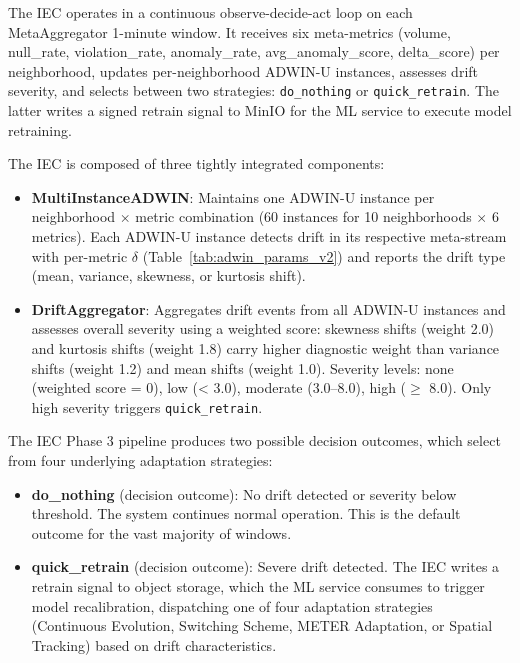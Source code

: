 The IEC operates in a continuous observe-decide-act loop on each MetaAggregator 1-minute window. It receives six meta-metrics (volume, null\_rate, violation\_rate, anomaly\_rate, avg\_anomaly\_score, delta\_score) per neighborhood, updates per-neighborhood ADWIN-U instances, assesses drift severity, and selects between two strategies: \texttt{do\_nothing} or \texttt{quick\_retrain}. The latter writes a signed retrain signal to MinIO for the ML service to execute model retraining.


The IEC is composed of three tightly integrated components:

\begin{itemize}
    \item \textbf{MultiInstanceADWIN}: Maintains one ADWIN-U instance per neighborhood $\times$ metric combination (60 instances for 10 neighborhoods $\times$ 6 metrics). Each ADWIN-U instance detects drift in its respective meta-stream with per-metric $\delta$ (Table~\ref{tab:adwin_params_v2}) and reports the drift type (mean, variance, skewness, or kurtosis shift).
    \item \textbf{DriftAggregator}: Aggregates drift events from all ADWIN-U instances and assesses overall severity using a weighted score: skewness shifts (weight 2.0) and kurtosis shifts (weight 1.8) carry higher diagnostic weight than variance shifts (weight 1.2) and mean shifts (weight 1.0). Severity levels: none (weighted score = 0), low (< 3.0), moderate (3.0--8.0), high ($\geq$ 8.0). Only high severity triggers \texttt{quick\_retrain}.
\end{itemize}


The IEC Phase 3 pipeline produces two possible decision outcomes, which select from four underlying adaptation strategies:

\begin{itemize}
    \item \textbf{do\_nothing} (decision outcome): No drift detected or severity below threshold. The system continues normal operation. This is the default outcome for the vast majority of windows.
    \item \textbf{quick\_retrain} (decision outcome): Severe drift detected. The IEC writes a retrain signal to object storage, which the ML service consumes to trigger model recalibration, dispatching one of four adaptation strategies (Continuous Evolution, Switching Scheme, METER Adaptation, or Spatial Tracking) based on drift characteristics.
\end{itemize}

